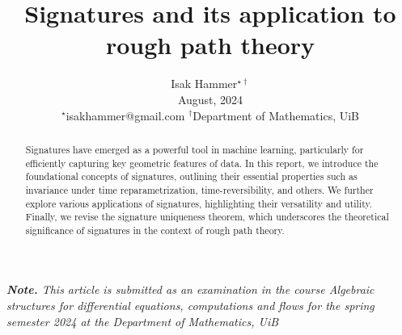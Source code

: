 \documentclass[10pt,conference]{IEEEtran}
\title{ {\Large \textbf{Signatures and its application to rough path theory  }} }
\begin{document}
\author{
Isak Hammer$^{\star\dagger}$  \\
{\small  August, 2024}\\
{\footnotesize $^\star$isakhammer@gmail.com }
{\footnotesize $^\dagger$Department of Mathematics, UiB}\\
}

\maketitle
\begin{sloppy}
 \textit{ \textbf{Note.} This article is submitted as an examination in the course Algebraic structures for differential equations, computations and flows for the spring semester 2024 at the Department of Mathematics, UiB \\}

\begin{abstract} Signatures have emerged as a powerful tool in machine learning, particularly for efficiently capturing key geometric features of data. In this report, we introduce the foundational concepts of signatures, outlining their essential
properties such as invariance under time reparametrization, time-reversibility, and others. We further explore various applications of signatures, highlighting their versatility and utility. Finally, we revise the signature uniqueness theorem, which underscores the theoretical significance of signatures in the context of rough path theory.
\end{abstract}

    
    

    \printbibliography
\end{sloppy}
\end{document}
